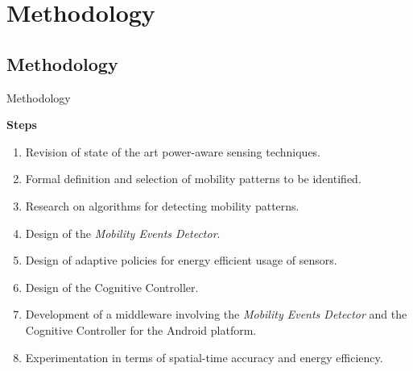 \section{Methodology}
\subsection{Methodology}
\begin{frame}{Methodology}
\small
\begin{block}{\small \textbf{Steps}}
\begin{enumerate}
  \item Revision of state of the art power-aware sensing techniques.
  \item Formal definition and selection of mobility patterns to be identified.
  \item Research on algorithms for detecting mobility patterns.
  \item Design of the \emph{Mobility Events Detector}.
  \item Design of adaptive policies for energy efficient usage of sensors.
  \item Design of the Cognitive Controller.
  \item Development of a middleware involving the \emph{Mobility Events Detector} and the Cognitive Controller for the Android platform.
  \item Experimentation in terms of spatial-time accuracy and energy efficiency.
\end{enumerate}
\end{block}
\end{frame}

